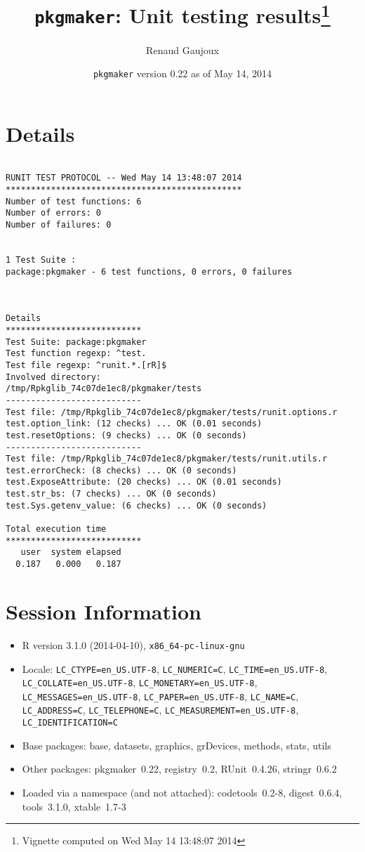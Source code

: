 \documentclass[10pt]{article}\usepackage[]{graphicx}\usepackage[]{color}
\author{Renaud Gaujoux}
\title{\texttt{pkgmaker}: Unit testing results\footnote{Vignette computed  on Wed May 14 13:48:07 2014}}
\date{\texttt{pkgmaker} version 0.22 as of May 14, 2014}
\begin{document}
\maketitle

\section{Details}
\begin{verbatim}

RUNIT TEST PROTOCOL -- Wed May 14 13:48:07 2014 
*********************************************** 
Number of test functions: 6 
Number of errors: 0 
Number of failures: 0 

 
1 Test Suite : 
package:pkgmaker - 6 test functions, 0 errors, 0 failures



Details 
*************************** 
Test Suite: package:pkgmaker 
Test function regexp: ^test. 
Test file regexp: ^runit.*.[rR]$ 
Involved directory: 
/tmp/Rpkglib_74c07de1ec8/pkgmaker/tests 
--------------------------- 
Test file: /tmp/Rpkglib_74c07de1ec8/pkgmaker/tests/runit.options.r 
test.option_link: (12 checks) ... OK (0.01 seconds)
test.resetOptions: (9 checks) ... OK (0 seconds)
--------------------------- 
Test file: /tmp/Rpkglib_74c07de1ec8/pkgmaker/tests/runit.utils.r 
test.errorCheck: (8 checks) ... OK (0 seconds)
test.ExposeAttribute: (20 checks) ... OK (0.01 seconds)
test.str_bs: (7 checks) ... OK (0 seconds)
test.Sys.getenv_value: (6 checks) ... OK (0 seconds)

Total execution time
***************************
   user  system elapsed 
  0.187   0.000   0.187 

\end{verbatim}

\section*{Session Information}
\begin{itemize}\raggedright
  \item R version 3.1.0 (2014-04-10), \verb|x86_64-pc-linux-gnu|
  \item Locale: \verb|LC_CTYPE=en_US.UTF-8|, \verb|LC_NUMERIC=C|, \verb|LC_TIME=en_US.UTF-8|, \verb|LC_COLLATE=en_US.UTF-8|, \verb|LC_MONETARY=en_US.UTF-8|, \verb|LC_MESSAGES=en_US.UTF-8|, \verb|LC_PAPER=en_US.UTF-8|, \verb|LC_NAME=C|, \verb|LC_ADDRESS=C|, \verb|LC_TELEPHONE=C|, \verb|LC_MEASUREMENT=en_US.UTF-8|, \verb|LC_IDENTIFICATION=C|
  \item Base packages: base, datasets, graphics, grDevices, methods,
    stats, utils
  \item Other packages: pkgmaker~0.22, registry~0.2, RUnit~0.4.26,
    stringr~0.6.2
  \item Loaded via a namespace (and not attached): codetools~0.2-8,
    digest~0.6.4, tools~3.1.0, xtable~1.7-3
\end{itemize}
\end{document}
